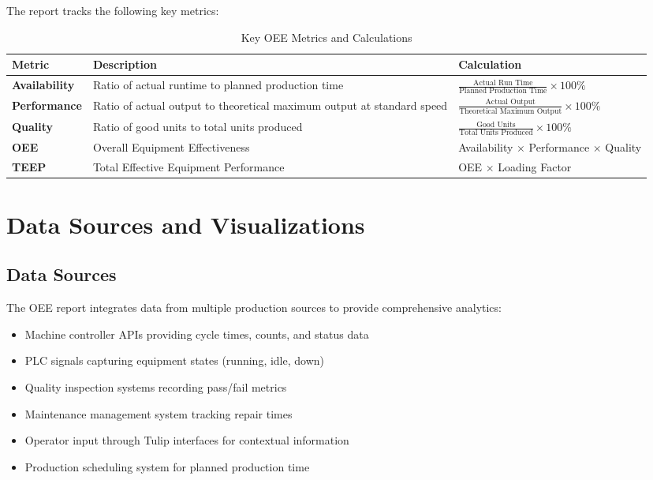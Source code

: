 \documentclass[11pt,a4paper]{article}
\begin{document}
The report tracks the following key metrics:

\begin{table}[H]
    \centering
    \begin{tabular}{>{\bfseries}p{3cm}p{5cm}p{4cm}}
        \toprule
        \textbf{Metric} & \textbf{Description} & \textbf{Calculation} \\
        \midrule
        Availability & Ratio of actual runtime to planned production time & $\frac{\text{Actual Run Time}}{\text{Planned Production Time}} \times 100\%$ \\
        \addlinespace
        Performance & Ratio of actual output to theoretical maximum output at standard speed & $\frac{\text{Actual Output}}{\text{Theoretical Maximum Output}} \times 100\%$ \\
        \addlinespace
        Quality & Ratio of good units to total units produced & $\frac{\text{Good Units}}{\text{Total Units Produced}} \times 100\%$ \\
        \addlinespace
        OEE & Overall Equipment Effectiveness & Availability $\times$ Performance $\times$ Quality \\
        \addlinespace
        TEEP & Total Effective Equipment Performance & OEE $\times$ Loading Factor \\
        \bottomrule
    \end{tabular}
    \caption{Key OEE Metrics and Calculations}
    \label{tab:metrics}
\end{table}

\section{Data Sources and Visualizations}

\subsection{Data Sources}

The OEE report integrates data from multiple production sources to provide comprehensive analytics:

\begin{itemize}
    \item Machine controller APIs providing cycle times, counts, and status data
    \item PLC signals capturing equipment states (running, idle, down)
    \item Quality inspection systems recording pass/fail metrics
    \item Maintenance management system tracking repair times
    \item Operator input through Tulip interfaces for contextual information
    \item Production scheduling system for planned production time
\end{itemize}
\end{document}

